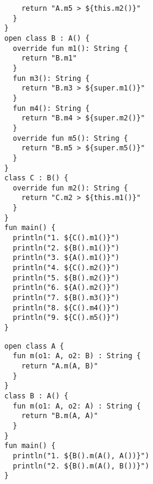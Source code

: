 \begin{Exercise}[title={Orden de ejecución}]
\begin{verbatim}
            return "A.m5 > ${this.m2()}"
          }
        }
        open class B : A() {
          override fun m1(): String {
            return "B.m1"
          }
          fun m3(): String {
            return "B.m3 > ${super.m1()}"
          }
          fun m4(): String {
            return "B.m4 > ${super.m2()}"
          }
          override fun m5(): String {
            return "B.m5 > ${super.m5()}"
          }
        }
        class C : B() {
          override fun m2(): String {
            return "C.m2 > ${this.m1()}"
          }
        }
        fun main() {
          println("1. ${C().m1()}")
          println("2. ${B().m1()}")
          println("3. ${A().m1()}")
          println("4. ${C().m2()}")
          println("5. ${B().m2()}")
          println("6. ${A().m2()}")
          println("7. ${B().m3()}")
          println("8. ${C().m4()}")
          println("9. ${C().m5()}")
        }
      \end{verbatim}
    \Question
      \begin{verbatim}
        open class A {
          fun m(o1: A, o2: B) : String {
            return "A.m(A, B)"
          }
        }
        class B : A() {
          fun m(o1: A, o2: A) : String {
            return "B.m(A, A)"
          }
        }
        fun main() {
          println("1. ${B().m(A(), A())}")
          println("2. ${B().m(A(), B())}")
        }
      \end{verbatim}
  \end{Exercise}

